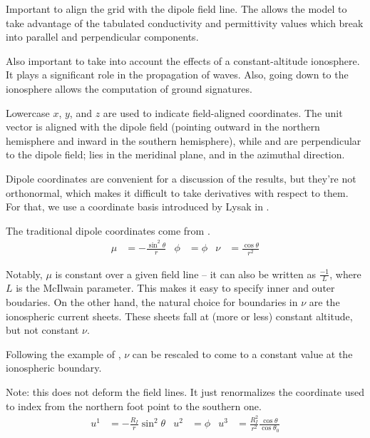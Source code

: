Important to align the grid with the dipole field line. The allows the model to take advantage of the tabulated conductivity and permittivity values which break into parallel and perpendicular components. 

Also important to take into account the effects of a constant-altitude ionosphere. It plays a significant role in the propagation of \Alfven waves. Also, going down to the ionosphere allows the computation of ground signatures. 

Lowercase $x$, $y$, and $z$ are used to indicate field-aligned coordinates. The
unit vector \zhat is aligned with the dipole field (pointing outward in the
northern hemisphere and inward in the southern hemisphere), while \xhat and
\yhat are perpendicular to the dipole field; \xhat lies in the meridinal plane,
and \yhat in the azimuthal direction.

Dipole coordinates are convenient for a discussion of the results, but they're not orthonormal, which makes it difficult to take derivatives with respect to them. For that, we use a coordinate basis introduced by Lysak in \cite{lysak_2004}. 


The traditional dipole coordinates come from \cite{radoski_1967_coords}. 
\begin{align}
  \mu & = -\frac{\sin^2 \theta}{r} & \phi & = \phi & \nu & = \frac{\cos \theta}{r^2}
\end{align}

Notably, $\mu$ is constant over a given field line -- it can also be written as
$\frac{-1}{L}$, where $L$ is the McIlwain parameter. This makes it easy to
specify inner and outer boudaries. On the other hand, the natural choice for
boundaries in $\nu$ are the ionospheric current sheets. These sheets fall at 
(more or less) constant altitude, but not constant $\nu$. 

Following the example of \cite{lysak_2004}, $\nu$ can be rescaled to come to a
constant value at the ionospheric boundary. 

Note: this does not deform the field lines. It just renormalizes the coordinate used to index from the northern foot point to the southern one. 
\begin{align}
  \label{def_coords}
  u^1 & = - \frac{R_I}{r} \sin^2 \theta & 
  u^2 & = \phi &
  u^3 & = \frac{R_I^2}{r^2} \frac{\cos \theta}{\cos \theta_0}
\end{align}

